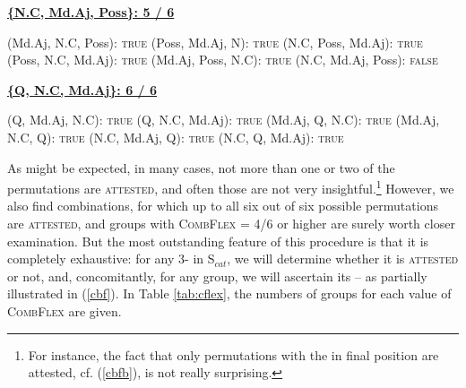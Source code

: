 \documentclass[output=paper,colorlinks,citecolor=brown,draft]{langscibook}
\begin{document}
\begin{exe}
\begin{xlist}
        \ex \textbf{\uline{ \{N.C, Md.Aj, Poss\}: \hfill 5 / 6 } }
          \begin{xlist}
              \ex (Md.Aj, N.C, Poss): \hfill \textsc{true}
              \ex (Poss, Md.Aj, N): \hfill \textsc{true}
              \ex (N.C, Poss, Md.Aj): \hfill \textsc{true}
              \ex (Poss, N.C, Md.Aj): \hfill  \textsc{true}
              \ex (Md.Aj, Poss,  N.C): \hfill  \textsc{true}
              \ex (N.C, Md.Aj, Poss):  \hfill \textsc{false} \\ 
          \end{xlist}

        \ex \textbf{\uline{ \{Q, N.C, Md.Aj\}: \hfill 6 / 6 }}
          \begin{xlist}
              \ex (Q, Md.Aj, N.C):   \hfill \textsc{true}
              \ex (Q, N.C, Md.Aj):   \hfill \textsc{true}
              \ex (Md.Aj, Q, N.C):   \hfill \textsc{true}
              \ex (Md.Aj, N.C, Q):   \hfill \textsc{true}
              \ex (N.C, Md.Aj, Q):   \hfill \textsc{true}
              \ex (N.C, Q, Md.Aj):  \hfill  \textsc{true}
          \end{xlist}

     \end{xlist}
\end{exe} 

As might be expected, in many cases, not more than one or two of the permutations are \textsc{attested}, and often those are not very insightful.\footnote{For instance, the fact that only permutations with the  in final position are attested, cf. (\ref{cbfb}), is not really surprising.  }  
However,  we also find combinations, for which up to all six out of six possible permutations are \textsc{attested}, and  groups with \textsc{CombFlex} = 4/6 or higher are surely worth closer examination. But the most outstanding feature of this procedure is that it is completely exhaustive: for any 3- in  S$_{cat}$, we will determine whether it is \textsc{attested} or not, and, concomitantly, for any  group, we will ascertain its  -- as partially illustrated in (\ref{cbf}).  
In Table \ref{tab:cflex}, the numbers of  groups for each value of \textsc{CombFlex} are given.
\end{document}
